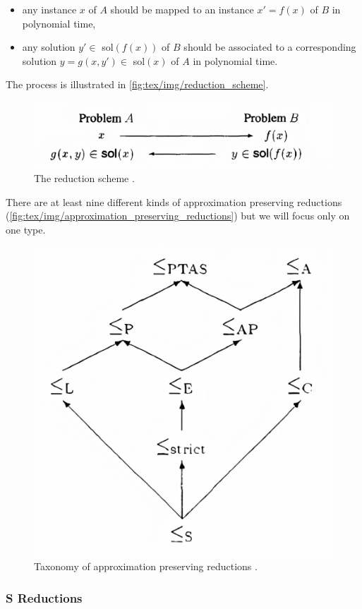 \begin{itemize}
	\item any instance $x$ of $A$ should be mapped to an instance $x' = f(x)$
	      of $B$ in polynomial time,
	\item any solution $y' \in $ sol$(f(x))$ of $B$ should be associated to a corresponding
	      solution $y = g(x, y') \in $ sol$(x)$ of $A$ in polynomial time.
\end{itemize}

The process is illustrated in \autoref{fig:tex/img/reduction_scheme}.

\begin{figure}
	\centering
	\includegraphics[width=0.6\linewidth]{tex/img/reduction_scheme.png}
	\caption[Reduction process]{The reduction scheme \cite{Crescenzi1997ASG}.}%
	\label{fig:tex/img/reduction_scheme}
\end{figure}

There are at least nine different kinds of approximation preserving reductions
\cite{DemaineFall2014}(\autoref{fig:tex/img/approximation_preserving_reductions}) but we will
focus only on one type.

\begin{figure}[b]
	\centering
	\includegraphics[width=0.4\linewidth]{tex/img/approximation_preserving_reductions.png}
	\caption[Taxonomy of approximation preserving reductions]{Taxonomy of
		approximation preserving reductions \cite{Crescenzi1997ASG}.}%
	\label{fig:tex/img/approximation_preserving_reductions}
\end{figure}

\subsubsection{S Reductions}%
\label{sub:strict_reductions}

